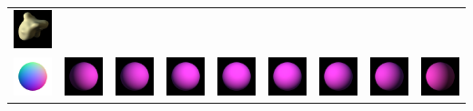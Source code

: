 \begin{center}
\begin{longtable}{@{}c@{}c@{}c@{}c@{}c@{}c@{}c@{}c@{}c@{}}
\includegraphics[width=0.1\linewidth]{training/30_7.png} \\
\includegraphics[width=0.1\linewidth]{training/31_gt.png} & \includegraphics[width=0.1\linewidth]{training/31_0.png} &
\includegraphics[width=0.1\linewidth]{training/31_1.png} & \includegraphics[width=0.1\linewidth]{training/31_2.png} &
\includegraphics[width=0.1\linewidth]{training/31_3.png} & \includegraphics[width=0.1\linewidth]{training/31_4.png} &
\includegraphics[width=0.1\linewidth]{training/31_5.png} & \includegraphics[width=0.1\linewidth]{training/31_6.png} &
\includegraphics[width=0.1\linewidth]{training/31_7.png} \\

\end{longtable}
\end{center}
